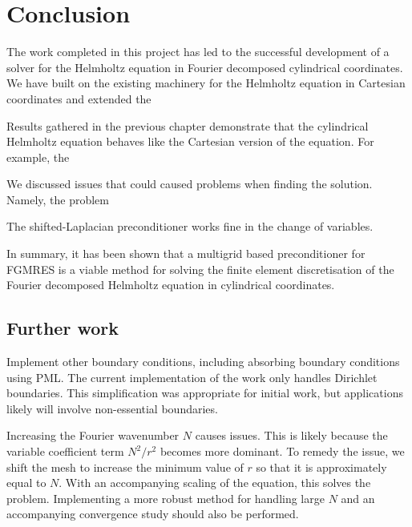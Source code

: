 \chapter{Conclusion}

The work completed in this project has led to the successful development of a solver for the Helmholtz equation in Fourier decomposed cylindrical coordinates.
We have built on the existing machinery for the Helmholtz equation in Cartesian coordinates and extended the 

Results gathered in the previous chapter demonstrate that the cylindrical Helmholtz equation behaves like the Cartesian version of the equation.
For example, the 

We discussed issues that could caused problems when finding the solution.
Namely, the problem

The shifted-Laplacian preconditioner works fine in the change of variables.

In summary, it has been shown that a multigrid based preconditioner for FGMRES is a viable method for solving the finite element discretisation of the Fourier decomposed Helmholtz equation in cylindrical coordinates.






\section{Further work}

Implement other boundary conditions, including absorbing boundary conditions using PML.
The current implementation of the work only handles Dirichlet boundaries.
This simplification was appropriate for initial work, but applications likely will involve non-essential boundaries.

Increasing the Fourier wavenumber $N$ causes issues.
This is likely because the variable coefficient term $N^2/r^2$ becomes more dominant.
To remedy the issue, we shift the mesh to increase the minimum value of $r$ so that it is approximately equal to $N$.
With an accompanying scaling of the equation, this solves the problem.
Implementing a more robust method for handling large $N$ and an accompanying convergence study should also be performed.

